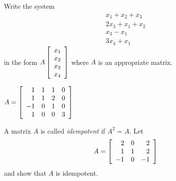 \begin{enumialphparenastyle}
\begin{ex} Write the system
\begin{equation*}
\begin{array}{c}
x_{1}+x_{2}+x_{3} \\
2x_{3}+x_{1}+x_{2} \\
x_{3}-x_{1} \\
3x_{4}+x_{1}
\end{array}
\end{equation*}
 in the form $A\left[
\begin{array}{c}
x_{1} \\
x_{2} \\
x_{3} \\
x_{4}
\end{array}
\right] $ where $A$ is an appropriate matrix. 
\begin{sol}
$A=\left[
\begin{array}{rrrr}
1 & 1 & 1 & 0 \\
1 & 1 & 2 & 0 \\
-1 & 0 & 1 & 0 \\
1 & 0 & 0 & 3
\end{array}
\right]$
\end{sol}
\end{ex}


\begin{ex} A matrix $A$ is called {\em idempotent \em}if $A^{2}=A.$ 
Let
\begin{equation*}
A=
\left[
\begin{array}{rrr}
2 & 0 & 2 \\
1 & 1 & 2 \\
-1 & 0 & -1
\end{array}
\right]
\end{equation*}
and show that $A$ is idempotent. 
\end{ex}

\end{enumialphparenastyle}
